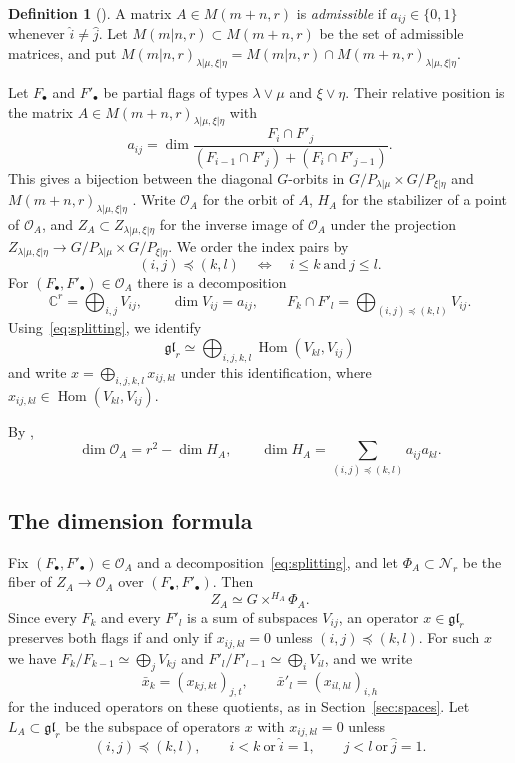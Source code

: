 \documentclass[11pt,a4paper]{amsart}
\theoremstyle{definition}
\newtheorem{definition}[theorem]{Definition}
\theoremstyle{remark}
\newcommand{\C}{\mathbb C}
\newcommand{\N}{\mathcal N}
\newcommand{\Hom}{\operatorname{Hom}}
\newcommand{\lm}{\lambda|\mu}
\newcommand{\xh}{\xi|\eta}
\newcommand{\Mat}{M(m+n,r)}
\newcommand{\Smat}{M(m|n,r)}
\numberwithin{equation}{section}
\begin{document}
\begin{definition}[{\cite[(3.0.1)]{DuRui}}]
A matrix $A\in\Mat$ is \emph{admissible} if $a_{ij}\in\{0,1\}$ whenever
$\widehat i\ne\widehat j$. Let $\Smat\subset\Mat$ be the set of admissible
matrices, and put $\Smat_{\lm,\xh}=\Smat\cap\Mat_{\lm,\xh}$.
\end{definition}

Let $F_\bullet$ and $F'_\bullet$ be partial flags of types
$\lambda\vee\mu$ and $\xi\vee\eta$. Their relative position is the matrix
$A\in\Mat_{\lm,\xh}$ with
$$
a_{ij}=\dim\frac{F_i\cap F'_j}{(F_{i-1}\cap F'_j)+(F_i\cap F'_{j-1})}.
$$
This gives a bijection between the diagonal $G$-orbits in
$G/P_{\lm}\times G/P_{\xh}$ and $\Mat_{\lm,\xh}$ \cite{BLM}. Write $\mathcal O_A$ for
the orbit of $A$, $H_A$ for the stabilizer of a point of $\mathcal O_A$,
and $Z_A\subset Z_{\lm,\xh}$ for the inverse image of $\mathcal O_A$ under
the projection $Z_{\lm,\xh}\to G/P_{\lm}\times G/P_{\xh}$. We order the
index pairs by
$$
(i,j)\preceq(k,l)\quad\Longleftrightarrow\quad i\le k\ \text{and}\ j\le l .
$$
For $(F_\bullet,F'_\bullet)\in\mathcal O_A$ there is a decomposition
\begin{equation}\label{eq:splitting}
\C^r=\bigoplus_{i,j}V_{ij},\qquad\dim V_{ij}=a_{ij},\qquad
F_k\cap F'_l=\bigoplus_{(i,j)\preceq(k,l)}V_{ij}.
\end{equation}
Using~\eqref{eq:splitting}, we identify
$$
\mathfrak{gl}_r
\simeq
\bigoplus_{i,j,k,l}\Hom(V_{kl},V_{ij})
$$
and write $x=\bigoplus_{i,j,k,l}x_{ij,kl}$ under this identification,
where $x_{ij,kl}\in\Hom(V_{kl}, V_{ij})$.

By \cite[2.1]{BLM},
\begin{equation}\label{eq:orbit}
\dim\mathcal O_A=r^2-\dim H_A,
\qquad
\dim H_A
=\sum_{(i,j)\preceq(k,l)}a_{ij}a_{kl}.
\end{equation}

\subsection{The dimension formula}

Fix $(F_\bullet,F'_\bullet)\in\mathcal O_A$ and a
decomposition~\eqref{eq:splitting}, and let $\Phi_A\subset\N_r$ be the
fiber of $Z_A\to\mathcal O_A$ over $(F_\bullet,F'_\bullet)$. Then
\begin{equation}\label{eq:ZA-bundle}
Z_A\simeq G\times^{H_A}\Phi_A.
\end{equation}
Since every $F_k$ and every $F'_l$ is a sum of subspaces $V_{ij}$, an
operator $x\in\mathfrak{gl}_r$ preserves both flags if and only if
$x_{ij,kl}=0$ unless $(i,j)\preceq(k,l)$. For such $x$ we have
$F_k/F_{k-1}\simeq\bigoplus_jV_{kj}$ and
$F'_l/F'_{l-1}\simeq\bigoplus_iV_{il}$, and we write
$$
\bar x_k=(x_{kj,kt})_{j,t},\qquad \bar x'_l=(x_{il,hl})_{i,h}
$$
for the induced operators on these quotients, as in
Section~\ref{sec:spaces}. Let
$L_A\subset\mathfrak{gl}_r$ be the subspace of operators $x$ with
$x_{ij,kl}=0$ unless
\begin{equation}\label{eq:allowed}
(i,j)\preceq(k,l),\qquad
i<k\ \text{or}\ \widehat i=1,\qquad
j<l\ \text{or}\ \widehat j=1.
\end{equation}
\end{document}
